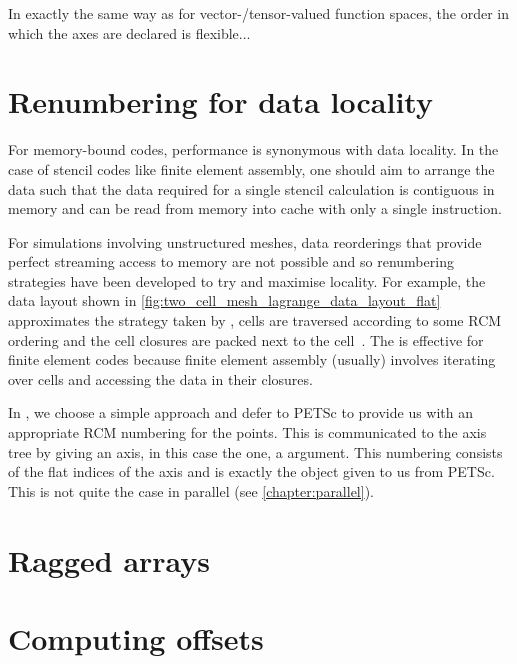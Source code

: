 \documentclass[thesis]{subfiles}
\begin{document}

In exactly the same way as for vector-/tensor-valued function spaces, the order in which the axes are declared is flexible...

\section{Renumbering for data locality}
\label{sec:renumbering}

For memory-bound codes, performance is synonymous with data locality.
In the case of stencil codes like finite element assembly, one should aim to arrange the data such that the data required for a single stencil calculation is contiguous in memory and can be read from memory into cache with only a single instruction.

For simulations involving unstructured meshes, data reorderings that provide perfect streaming access to memory are not possible and so renumbering strategies have been developed to try and maximise locality.
For example, the data layout shown in \cref{fig:two_cell_mesh_lagrange_data_layout_flat} approximates the strategy taken by , cells are traversed according to some RCM ordering and the cell closures are packed next to the cell~\cite{langeEfficientMeshManagement2016}.
The is effective for finite element codes because finite element assembly (usually) involves iterating over cells and accessing the data in their closures.

In , we choose a simple approach and defer to PETSc to provide us with an appropriate RCM numbering for the points.
This is communicated to the axis tree by giving an axis, in this case the  one, a  argument.
This numbering consists of the flat indices of the axis and is exactly the object given to us from PETSc.
This is not quite the case in parallel (see \cref{chapter:parallel}).

\section{Ragged arrays}

\section{Computing offsets}
\end{document}
